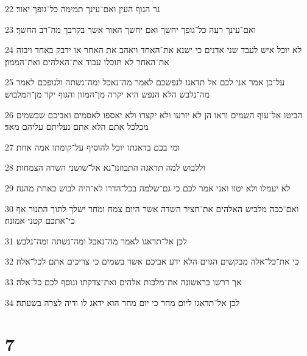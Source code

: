 \par 22 נר הגוף העין ואם־עינך תמימה כל־גופך יאור׃
\par 23 ואם־עינך רעה כל־גופך יחשך ואם יחשך האור אשר בקרבך מה־רב החשך׃
\par 24 לא יוכל איש לעבד שני אדנים כי ישנא את־האחד ויאהב את האחר או ידבק באחד ויבזה את־האחר לא תוכלו עבוד את־האלהים ואת־הממון׃
\par 25 על־כן אמר אני לכם אל תדאגו לנפשכם לאמר מה־נאכל ומה־נשתה ולגופכם לאמר מה־נלבש הלא הנפש היא יקרה מן־המזון והגוף יקר מן־המלבוש׃
\par 26 הביטו אל־עוף השמים וראו הן לא יזרעו ולא יקצרו ולא יאספו לאסמים ואביכם שבשמים מכלכל אתם הלא אתם נעליתם עליהם מאד׃
\par 27 ומי בכם בדאגתו יוכל להוסיף על־קומתו אמה אחת׃
\par 28 וללבוש למה תדאגה התבוזנו־נא אל־שושני השדה הצמחות׃
\par 29 לא יעמלו ולא יטוו ואני אמר לכם כי גם־שלמה בכל־הדרו לא־היה לבוש כאחת מהנה׃
\par 30 ואם־ככה מלביש האלהים את־חציר השדה אשר היום צמח ומחר ישלך לתוך התנור אף כי־אתכם קטני אמונה׃
\par 31 לכן אל־תדאגו לאמר מה־נאכל ומה־נשתה ומה־נלבש׃
\par 32 כי את־כל־אלה מבקשים הגוים הלא ידע אביכם אשר בשמים כי צריכים אתם לכל־אלה׃
\par 33 אך דרשו בראשונה את־מלכות אלהים ואת־צדקתו ונוסף לכם כל־אלה׃
\par 34 לכן אל־תדאגו ליום מחר כי יום מחר הוא ידאג לו ודיה לצרה בשעתה׃

\chapter{7}

